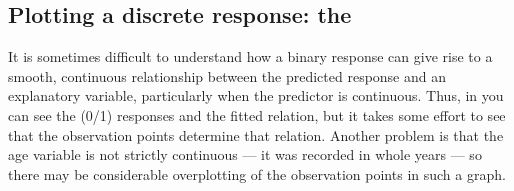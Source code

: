 \subsection{Plotting a discrete response: the }\label{sec:logist-logodds}

It is sometimes difficult to understand how a binary response can give
rise to a smooth, continuous relationship between the predicted response
and an explanatory variable, particularly when the predictor is
continuous.
Thus, in  you can see the (0/1) responses
and the fitted relation, but it takes some effort to see that
the observation points determine that relation.
Another problem is that the age variable is not strictly continuous ---
it was recorded in whole years --- so there may be considerable
overplotting of the observation points in such a graph.

